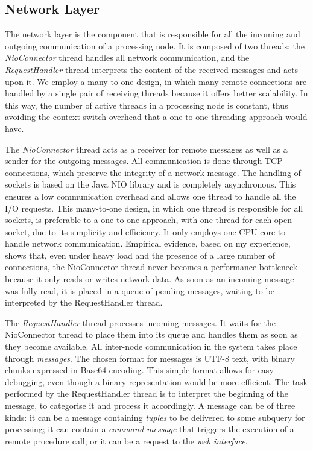 \subsection*{Network Layer}  
The network layer is the component that is responsible for all the incoming and outgoing communication
of a processing node. 
It is composed of two threads: the \emph{NioConnector} thread handles all
network communication, and the \emph{RequestHandler} thread interprets the content of the received
messages and acts upon it.
We employ a many-to-one design, in which many remote connections are handled by a single pair
of receiving threads because it offers better scalability. In this way, the
number of active threads in a processing node is constant, thus avoiding the context switch overhead that
a one-to-one threading approach would have.

The \emph{NioConnector} thread acts as a receiver for remote messages as well as a sender for the
outgoing messages. All communication is done through TCP connections, which preserve the integrity of a
network message.
The handling of sockets is based on the Java NIO library and is completely asynchronous. This ensures a
low communication overhead and allows one thread to handle all the I/O requests. This many-to-one
design, in which one thread is responsible for all sockets, is preferable to a one-to-one approach,
with one thread for each open socket, due to its simplicity and efficiency. It only employs one CPU
core to handle network communication. Empirical evidence, based on my experience, shows that, even under heavy load and the
presence of a large number of connections, the NioConnector thread never becomes a performance
bottleneck because it only reads or writes network data.
As soon as an incoming message was fully read, it is placed in a queue of pending messages, waiting
to be interpreted by the RequestHandler thread.

The \emph{RequestHandler} thread processes incoming messages. It waits for the
NioConnector thread to place them into its queue and handles them as soon as they become available. All
inter-node communication in the system takes place through \emph{messages}. 
The chosen format for messages is UTF-8 text, with
binary chunks expressed in Base64 encoding. This simple format allows
for easy debugging, even though a binary representation would be more efficient.
The task performed by the RequestHandler thread is to interpret the beginning of the message, to
categorise it and process it accordingly. A message can be of three kinds: it can be a message
containing \emph{tuples} to be delivered to some subquery for processing; it can contain a \emph{command
message} that triggers the execution of a remote procedure call; or it can be a request to the \emph{web interface}.
\vspace{-10pt}
